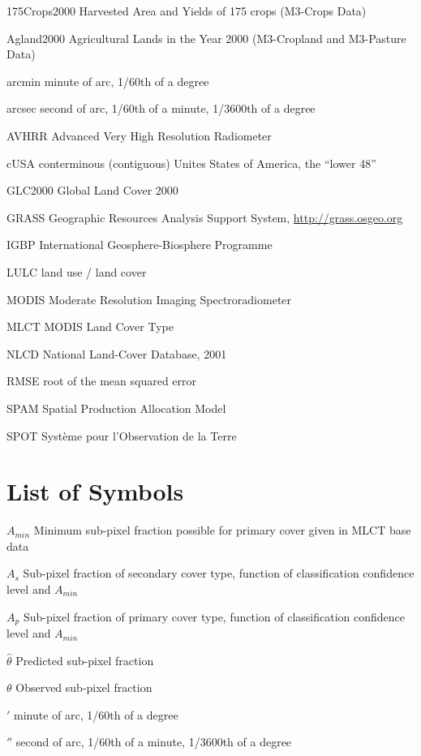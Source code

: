\documentclass[draftthesis]{neiuthesis}
\begin{document}
\begin{symbollist*}
\item[175Crops2000] Harvested Area and Yields of 175 crops (M3-Crops
  Data) \citep{Monfreda2008}
\item[Agland2000] Agricultural Lands in the Year 2000 (M3-Cropland and
  M3-Pasture Data) \citep{Ramankutty2008}
\item[arcmin] minute of arc, 1/60th of a degree
\item[arcsec] second of arc, 1/60th of a minute, 1/3600th of a degree
\item[AVHRR] Advanced Very High Resolution Radiometer
\item[cUSA] conterminous (contiguous) Unites States of America, the ``lower 48''
\item[GLC2000] Global Land Cover 2000 \citep{EC2003}
\item[GRASS] Geographic Resources Analysis Support System, \url{http://grass.osgeo.org}
\item[IGBP] International Geosphere-Biosphere Programme
\item[LULC] land use / land cover
\item[MODIS] Moderate Resolution Imaging Spectroradiometer
\item[MLCT] MODIS Land Cover Type \citep{MLCT}
\item[NLCD] National Land-Cover Database, 2001 \citep{Homer2004}
\item[RMSE] root of the mean squared error
\item[SPAM] Spatial Production Allocation Model
\item[SPOT] Syst\`eme pour l'Observation de la Terre

\end{symbollist*}

\chapter{List of Symbols}

\begin{symbollist}[0.7in]
\item[$A_{min}$] Minimum sub-pixel fraction possible for primary cover
  given in MLCT base data
\item[$A_s$] Sub-pixel fraction of secondary cover type, function of
  classification confidence level and $A_{min}$
\item[$A_p$] Sub-pixel fraction of primary cover type, function of
  classification confidence level and $A_{min}$
\item[$\hat\theta$] Predicted sub-pixel fraction
\item[$\theta$] Observed sub-pixel fraction
\item[$'$] minute of arc, 1/60th of a degree
\item[$''$] second of arc, 1/60th of a minute, 1/3600th of a degree
\end{symbollist}
\end{document}
